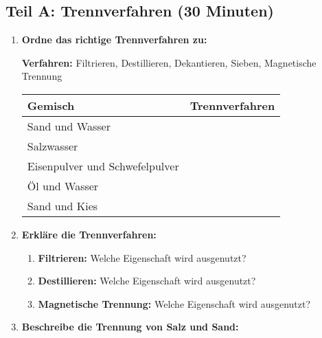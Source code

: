 \subsection*{Teil A: Trennverfahren (30 Minuten)}

\begin{enumerate}[label=\arabic*.]
    \item \textbf{Ordne das richtige Trennverfahren zu:}
    \vspace{0.5cm}

    \textbf{Verfahren:} Filtrieren, Destillieren, Dekantieren, Sieben, Magnetische Trennung

    \begin{tabular}{|p{7cm}|p{4cm}|}
        \hline
        \textbf{Gemisch} & \textbf{Trennverfahren} \\
        \hline
        Sand und Wasser & \\
        \hline
        Salzwasser & \\
        \hline
        Eisenpulver und Schwefelpulver & \\
        \hline
        Öl und Wasser & \\
        \hline
        Sand und Kies & \\
        \hline
    \end{tabular}

    \vspace{1cm}

    \item \textbf{Erkläre die Trennverfahren:}
    \vspace{0.5cm}

    \begin{enumerate}[label=\alph*)]
        \item \textbf{Filtrieren:} Welche Eigenschaft wird ausgenutzt?
        \vspace{1.5cm}

        \item \textbf{Destillieren:} Welche Eigenschaft wird ausgenutzt?
        \vspace{1.5cm}

        \item \textbf{Magnetische Trennung:} Welche Eigenschaft wird ausgenutzt?
        \vspace{1.5cm}
    \end{enumerate}

    \vspace{1cm}

    \item \textbf{Beschreibe die Trennung von Salz und Sand:}
    \vspace{0.5cm}


\end{enumerate}
